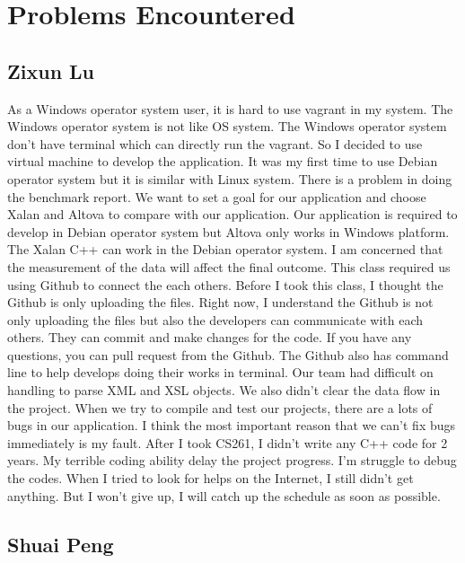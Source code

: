 \section{Problems Encountered}

\subsection{Zixun Lu}

As a Windows operator system user, it is hard to use vagrant in my system.
The Windows operator system is not like OS system. 
The Windows operator system don't have terminal which can directly run the vagrant. 
So I decided to use virtual machine to develop the application.
It was my first time to use Debian operator system but it is similar with Linux system. 
There is a problem in doing the benchmark report. 
We want to set a goal for our application and choose Xalan and Altova to compare with our application. 
Our application is required to develop in Debian operator system but Altova only works in Windows platform. 
The Xalan C++ can work in the Debian operator system. 
I am concerned that the measurement of the data will affect the final outcome. 
This class required us using Github to connect the each others.
Before I took this class, I thought the Github is only uploading the files.
Right now, I understand the Github is not only uploading the files but also the developers can communicate with each others. 
They can commit and make changes for the code. 
If you have any questions, you can pull request from the Github. 
The Github also has command line to help develops doing their works in terminal. 
Our team had difficult on handling to parse XML and XSL objects.
We also didn’t clear the data flow in the project. 
When we try to compile and test our projects, there are a lots of bugs in our application. 
I think the most important reason that we can’t fix bugs immediately is my fault. After I took CS261, I didn’t write any C++ code for 2 years. My terrible coding ability delay the project progress. 
I’m struggle to debug the codes. 
When I tried to look for helps on the Internet, I still didn’t get anything.
But I won't give up, I will catch up the schedule as soon as possible.  

\subsection{Shuai Peng}

